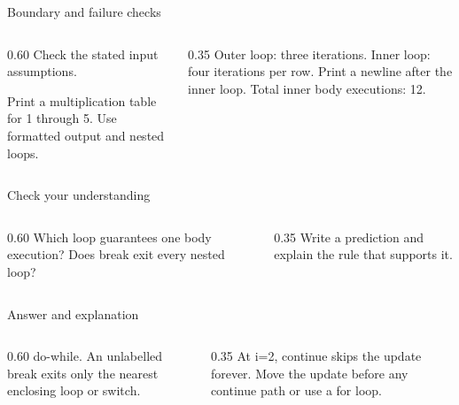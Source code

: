 \documentclass[10pt,aspectratio=169]{beamer}
\begin{document}
\begin{frame}[fragile,t]{Boundary and failure checks}
\begin{columns}[T,onlytextwidth]\begin{column}{0.60\textwidth}
Check the stated input assumptions.

Print a multiplication table for 1 through 5. Use formatted output and nested loops.
\end{column}\begin{column}{0.35\textwidth}\small
Outer loop: three iterations. Inner loop: four iterations per row. Print a newline after the inner loop. Total inner body executions: 12.
\end{column}\end{columns}
\end{frame}

\begin{frame}[fragile,t]{Check your understanding}
\begin{columns}[T,onlytextwidth]\begin{column}{0.60\textwidth}
Which loop guarantees one body execution? Does break exit every nested loop?
\end{column}\begin{column}{0.35\textwidth}\small
Write a prediction and explain the rule that supports it.
\end{column}\end{columns}
\end{frame}

\begin{frame}[fragile,t]{Answer and explanation}
\begin{columns}[T,onlytextwidth]\begin{column}{0.60\textwidth}
do-while. An unlabelled break exits only the nearest enclosing loop or switch.
\end{column}\begin{column}{0.35\textwidth}\small
At i=2, continue skips the update forever. Move the update before any continue path or use a for loop.
\end{column}\end{columns}
\end{frame}
\end{document}
